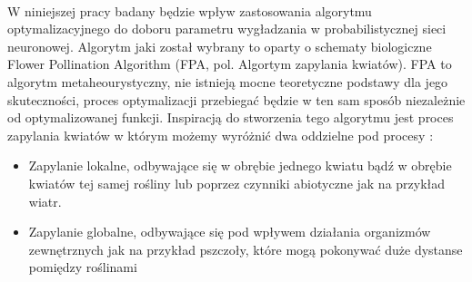 \documentclass[a4paper,12pt,twoside]{article}
\begin{document}
\paragraph{}
W niniejszej pracy badany będzie wpływ zastosowania algorytmu optymalizacyjnego do doboru parametru wygładzania w probabilistycznej sieci neuronowej. Algorytm jaki został wybrany to oparty o schematy biologiczne Flower Pollination Algorithm (FPA, pol. Algortym zapylania kwiatów). FPA to algorytm metaheourystyczny, nie istnieją mocne teoretyczne podstawy dla jego skuteczności, proces optymalizacji przebiegać będzie w ten sam sposób niezależnie od optymalizowanej funkcji.  Inspiracją do stworzenia tego algorytmu jest proces zapylania kwiatów w którym możemy wyróżnić dwa oddzielne pod procesy \cite{FPA}:
\begin{itemize}
\item Zapylanie lokalne, odbywające się w obrębie jednego kwiatu bądź w obrębie kwiatów tej samej rośliny lub poprzez czynniki abiotyczne jak na przykład wiatr. 
\item Zapylanie globalne, odbywające się pod wpływem działania organizmów zewnętrznych jak na przykład pszczoły, które mogą pokonywać duże dystanse pomiędzy roślinami
\end{itemize}
\end{document}
